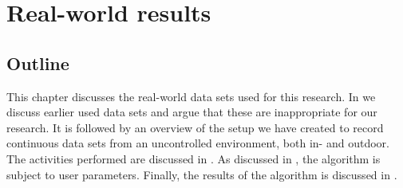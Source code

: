 
\chapter{Real-world results}

\label{Chapter6} %


\section{Outline}

This chapter discusses the real-world data sets used for this research.
In  we discuss earlier used data sets and argue that these are inappropriate for our research.
It is followed by an overview of the setup we have created to record continuous data sets from an uncontrolled environment, both in- and outdoor.
The activities performed are discussed in .
As discussed in , the algorithm is subject to user parameters.
Finally, the results of the algorithm is discussed in .




% 



